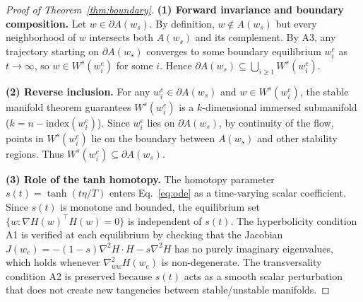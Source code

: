 \documentclass[10pt,twocolumn]{article}
\begin{document}
\begin{proof}[Proof of Theorem~\ref{thm:boundary}]
\textbf{(1) Forward invariance and boundary composition.}
Let $w \in \partial A(w_s)$. By definition, $w \notin A(w_s)$ but every neighborhood of $w$ intersects both $A(w_s)$ and its complement. By A3, any trajectory starting on $\partial A(w_s)$ converges to some boundary equilibrium $w_i^e$ as $t \to \infty$, so $w \in W^s(w_i^e)$ for some $i$. Hence $\partial A(w_s) \subseteq \bigcup_{i \geq 1} W^s(w_i^e)$.

\textbf{(2) Reverse inclusion.}
For any $w_i^e \in \partial A(w_s)$ and $w \in W^s(w_i^e)$, the stable manifold theorem guarantees $W^s(w_i^e)$ is a $k$-dimensional immersed submanifold ($k = n - \mathrm{index}(w_i^e)$). Since $w_i^e$ lies on $\partial A(w_s)$, by continuity of the flow, points in $W^s(w_i^e)$ lie on the boundary between $A(w_s)$ and other stability regions. Thus $W^s(w_i^e) \subseteq \partial A(w_s)$.

\textbf{(3) Role of the tanh homotopy.}
The homotopy parameter $s(t) = \tanh(t\eta/T)$ enters Eq.~\eqref{eq:ode} as a time-varying scalar coefficient. Since $s(t)$ is monotone and bounded, the equilibrium set $\{w : \nabla H(w)^\top H(w) = 0\}$ is independent of $s(t)$. The hyperbolicity condition A1 is verified at each equilibrium by checking that the Jacobian $J(w_e) = -(1-s)\nabla^2 H \cdot H - s \nabla^2 H$ has no purely imaginary eigenvalues, which holds whenever $\nabla^2_{ww} H(w_e)$ is non-degenerate. The transversality condition A2 is preserved because $s(t)$ acts as a smooth scalar perturbation that does not create new tangencies between stable/unstable manifolds.
\end{proof}
\end{document}
